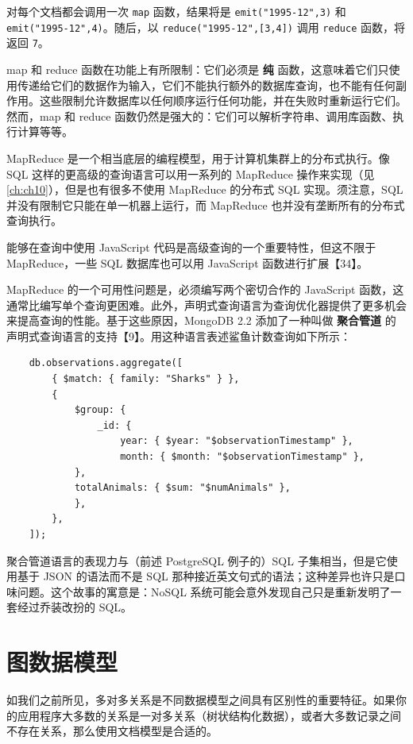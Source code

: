 对每个文档都会调用一次 \texttt{map} 函数，结果将是 \texttt{emit("1995-12",3)} 和 \texttt{emit("1995-12",4)}。随后，以 \texttt{reduce("1995-12",[3,4])} 调用 \texttt{reduce} 函数，将返回 \texttt{7}。

map 和 reduce 函数在功能上有所限制：它们必须是 \textbf{纯} 函数，这意味着它们只使用传递给它们的数据作为输入，它们不能执行额外的数据库查询，也不能有任何副作用。这些限制允许数据库以任何顺序运行任何功能，并在失败时重新运行它们。然而，map 和 reduce 函数仍然是强大的：它们可以解析字符串、调用库函数、执行计算等等。

MapReduce 是一个相当底层的编程模型，用于计算机集群上的分布式执行。像 SQL 这样的更高级的查询语言可以用一系列的 MapReduce 操作来实现（见 \autoref{ch:ch10}），但是也有很多不使用 MapReduce 的分布式 SQL 实现。须注意，SQL 并没有限制它只能在单一机器上运行，而 MapReduce 也并没有垄断所有的分布式查询执行。

能够在查询中使用 JavaScript 代码是高级查询的一个重要特性，但这不限于 MapReduce，一些 SQL 数据库也可以用 JavaScript 函数进行扩展【34】。

MapReduce 的一个可用性问题是，必须编写两个密切合作的 JavaScript 函数，这通常比编写单个查询更困难。此外，声明式查询语言为查询优化器提供了更多机会来提高查询的性能。基于这些原因，MongoDB 2.2 添加了一种叫做 \textbf{聚合管道} 的声明式查询语言的支持【9】。用这种语言表述鲨鱼计数查询如下所示：

\begin{lstlisting}
    db.observations.aggregate([
        { $match: { family: "Sharks" } },
        {
            $group: {
                _id: {
                    year: { $year: "$observationTimestamp" },
                    month: { $month: "$observationTimestamp" },
            },
            totalAnimals: { $sum: "$numAnimals" },
            },
        },
    ]);
\end{lstlisting}

聚合管道语言的表现力与（前述 PostgreSQL 例子的）SQL 子集相当，但是它使用基于 JSON 的语法而不是 SQL 那种接近英文句式的语法；这种差异也许只是口味问题。这个故事的寓意是：NoSQL 系统可能会意外发现自己只是重新发明了一套经过乔装改扮的 SQL。

\section{图数据模型}

如我们之前所见，多对多关系是不同数据模型之间具有区别性的重要特征。如果你的应用程序大多数的关系是一对多关系（树状结构化数据），或者大多数记录之间不存在关系，那么使用文档模型是合适的。

